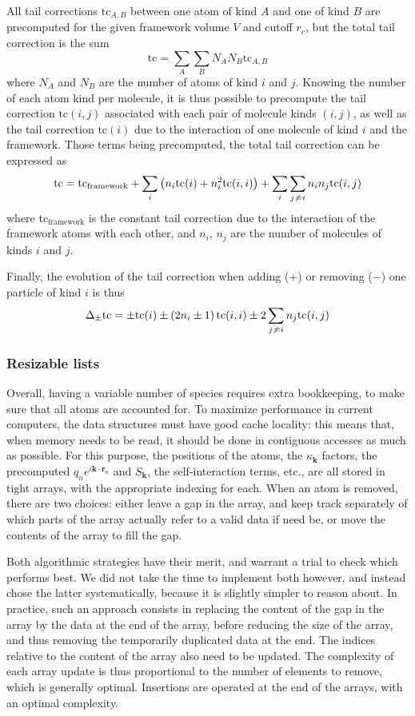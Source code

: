 \documentclass[main.tex]{subfiles}
\begin{document}
All tail corrections $\text{tc}_{A,B}$ between one atom of kind $A$ and one of kind $B$ are precomputed for the given framework volume $V$ and cutoff $r_c$, but the total tail correction is the sum
\[\text{tc} = \sum_A\sum_B N_AN_B\text{tc}_{A,B}\]
where $N_A$ and $N_B$ are the number of atoms of kind $i$ and $j$. Knowing the number of each atom kind per molecule, it is thus possible to precompute the tail correction $\text{tc}(i,j)$ associated with each pair of molecule kinds $(i,j)$, as well as the tail correction $\text{tc}(i)$ due to the interaction of one molecule of kind $i$ and the framework. Those terms being precomputed, the total tail correction can be expressed as
\[\text{tc} = \text{tc}_\text{framework} + \sum_i \left(n_i\text{tc}(i) + n_i^2\text{tc}(i,i)\right) + \sum_i\sum_{j\not\kern0.2ex= i} n_in_j\text{tc}(i,j)\]
where $\text{tc}_\text{framework}$ is the constant tail correction due to the interaction of the framework atoms with each other, and $n_i$, $n_j$ are the number of molecules of kinds $i$ and $j$.

Finally, the evolution of the tail correction when adding ($+$) or removing ($-$) one particle of kind $i$ is thus
\[\Delta_{\pm}\text{tc} = \pm\text{tc}(i) \pm\left(2n_i\pm1\right)\text{tc}(i,i) \pm 2\sum_{j\not\kern0.2ex= i} n_j\text{tc}(i,j)\]

\subsubsection{Resizable lists}

Overall, having a variable number of species requires extra bookkeeping, to make sure that all atoms are accounted for. To maximize performance in current computers, the data structures must have good cache locality: this means that, when memory needs to be read, it should be done in contiguous accesses as much as possible. For this purpose, the positions of the atoms, the $\kappa_{\boldsymbol k}$ factors, the precomputed $q_ne^{i\boldsymbol k\cdot \boldsymbol r_n}$ and $S_{\boldsymbol k}$, the self-interaction terms, etc., are all stored in tight arrays, with the appropriate indexing for each. When an atom is removed, there are two choices: either leave a gap in the array, and keep track separately of which parts of the array actually refer to a valid data if need be, or move the contents of the array to fill the gap.

Both algorithmic strategies have their merit, and warrant a trial to check which performs best. We did not take the time to implement both however, and instead chose the latter systematically, because it is slightly simpler to reason about. In practice, such an approach consists in replacing the content of the gap in the array by the data at the end of the array, before reducing the size of the array, and thus removing the temporarily duplicated data at the end. The indices relative to the content of the array also need to be updated. The complexity of each array update is thus proportional to the number of elements to remove, which is generally optimal. Insertions are operated at the end of the arrays, with an optimal complexity.
\end{document}
